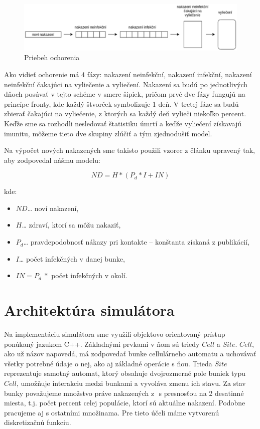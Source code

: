\documentclass[12pt,a4paper,titlepage]{article}
\begin{document}
\begin{figure}[h!]
    \center
    \includegraphics[width=1\linewidth]{koncepcia.eps}
    \caption{Priebeh ochorenia}
\end{figure}

Ako vidieť ochorenie má 4 fázy: nakazení neinfekční, nakazení infekční, nakazení neinfekční čakajúci na vyliečenie a vyliečení. Nakazení sa budú po jednotlivých dňoch posúvať v tejto schéme v smere šipiek, pričom prvé dve fázy fungujú na princípe fronty, kde každý štvorček symbolizuje 1 deň. V tretej fáze sa budú zbierať čakajúci na vyliečenie, z ktorých sa každý deň vylieči niekoľko percent. Keďže sme sa rozhodli nesledovať štatistiku úmrtí a keďže vyliečení získavajú imunitu, môžeme tieto dve skupiny zlúčiť a tým zjednodušiť model.


Na výpočet nových nakazených sme takisto použili vzorec z článku\cite{Zdroj} upravený tak, aby zodpovedal nášmu modelu:

{\Large\[ND =  H * ( P_d * I + IN )\]}%

\noindent kde:
\begin{itemize}
  \item \(ND\)… noví nakazení,
  \item \(H\)… zdraví, ktorí sa môžu nakaziť,
  \item \(P_d\)… pravdepodobnosť nákazy pri kontakte – konštanta získaná z publikácií\cite{Minnesota},
  \item \(I\)… počet infekčných v danej bunke,
  \item \(IN = P_d\:*\) počet infekčných v okolí.
\end{itemize}


\section{Architektúra simulátora}
Na implementáciu simulátora sme využili objektovo orientovaný prístup ponúkaný jazukom C++. Základnými prvkami v ňom sú triedy \(Cell\) a \(Site\). \(Cell\), ako už názov napovedá, má zodpovedať bunke cellulárneho automatu a uchovávať všetky potrebné údaje o nej, ako aj základné operácie s ňou. Trieda \(Site\) reprezentuje samotný automat, ktorý obsahuje dvojrozmerné pole buniek typu \(Cell\), umožňuje interakciu medzi bunkami a vyvoláva zmenu ich stavu. Za stav bunky považujeme množstvo práve nakazených z  \(<0,1>\) s presnosťou na 2 desatinné miesta, t.j. počet percent celej populácie, ktorí sú aktuálne nakazení. Podobne pracujeme aj s ostatními množinama. Pre tieto účeli máme vytvorenú diskretizačnú funkciu.
\end{document}
